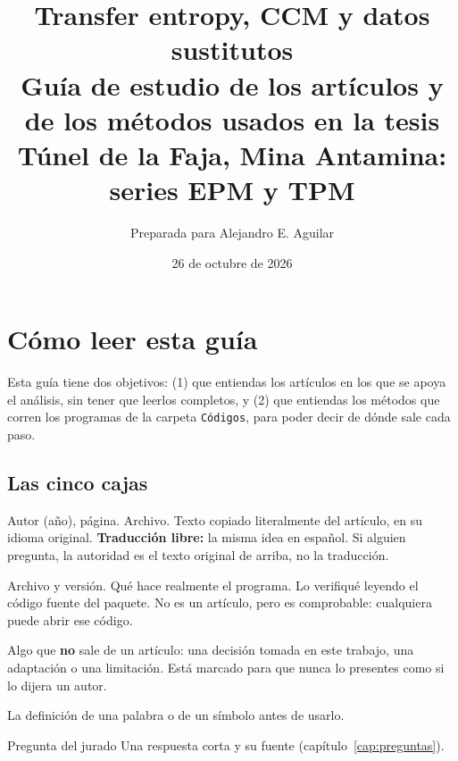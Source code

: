\documentclass[11pt,openany]{book}
\title{\textbf{Transfer entropy, CCM y datos sustitutos}\\[6pt]
\large Guía de estudio de los artículos y de los métodos usados en la tesis\\[4pt]
\normalsize Túnel de la Faja, Mina Antamina: series EPM y TPM}
\author{Preparada para Alejandro E. Aguilar}
\date{26 de octubre de 2026}
\newcommand{\archivo}[1]{\texttt{\small #1}}
\begin{document}
\maketitle
\tableofcontents

\chapter*{Cómo leer esta guía}

Esta guía tiene dos objetivos: (1) que entiendas los artículos en los que se apoya el análisis, sin tener que leerlos completos, y (2) que entiendas los métodos que corren los programas de la carpeta \archivo{Códigos}, para poder decir de dónde sale cada paso.

\section*{Las cinco cajas}

\begin{cita}{Autor (año), página. Archivo.}
Texto copiado literalmente del artículo, en su idioma original.
\tcblower
\textbf{Traducción libre:} la misma idea en español. Si alguien pregunta, la autoridad es el texto original de arriba, no la traducción.
\end{cita}

\begin{codigo}{Archivo y versión.}
Qué hace realmente el programa. Lo verifiqué leyendo el código fuente del paquete. No es un artículo, pero es comprobable: cualquiera puede abrir ese código.
\end{codigo}

\begin{ojo}
Algo que \textbf{no} sale de un artículo: una decisión tomada en este trabajo, una adaptación o una limitación. Está marcado para que nunca lo presentes como si lo dijera un autor.
\end{ojo}

\begin{nota}[Nota]
La definición de una palabra o de un símbolo antes de usarlo.
\end{nota}

\begin{respuesta}{Pregunta del jurado}
Una respuesta corta y su fuente (capítulo~\ref{cap:preguntas}).
\end{respuesta}
\end{document}
